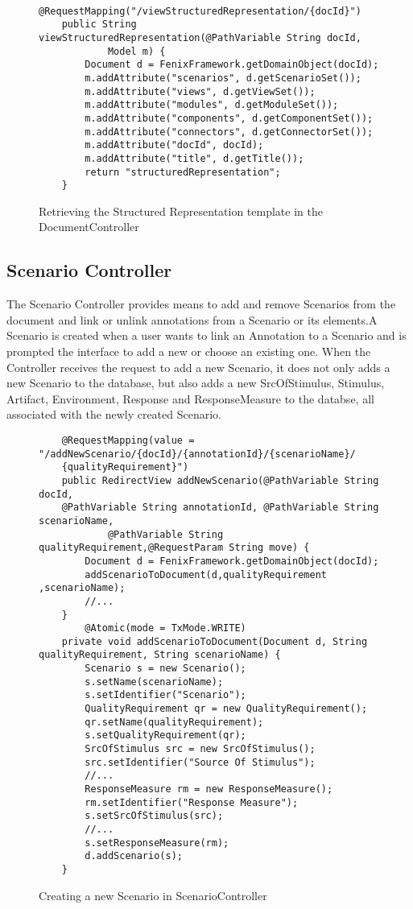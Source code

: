 \begin{itemize}
\begin{figure}[h]
\lstset{style=customjava}
\begin{lstlisting}
	@RequestMapping("/viewStructuredRepresentation/{docId}")
	public String viewStructuredRepresentation(@PathVariable String docId,
			Model m) {
		Document d = FenixFramework.getDomainObject(docId);
		m.addAttribute("scenarios", d.getScenarioSet());
		m.addAttribute("views", d.getViewSet());
		m.addAttribute("modules", d.getModuleSet());
		m.addAttribute("components", d.getComponentSet());
		m.addAttribute("connectors", d.getConnectorSet());
		m.addAttribute("docId", docId);
		m.addAttribute("title", d.getTitle());
		return "structuredRepresentation";
	}
\end{lstlisting}
\caption{Retrieving the Structured Representation template in the DocumentController}
\label{figure:documentControllerStructuredRepresentation}
\end{figure}
\end{itemize}

\subsection{Scenario Controller}

The Scenario Controller provides means to add and remove Scenarios from the document and link or unlink annotations from a Scenario or its elements.A Scenario is created when a user wants to link an Annotation to a Scenario and is prompted the interface to add a new or choose an existing one. When the Controller receives the request to add a new Scenario, it does not only adds a new Scenario to the database, but also adds a new SrcOfStimulus, Stimulus, Artifact, Environment, Response and ResponseMeasure to the databse, all associated with the newly created Scenario. 

\begin{figure}[h]
\lstset{style=customjava}
\begin{lstlisting}
	@RequestMapping(value = "/addNewScenario/{docId}/{annotationId}/{scenarioName}/
	{qualityRequirement}")
	public RedirectView addNewScenario(@PathVariable String docId, 
	@PathVariable String annotationId, @PathVariable String scenarioName, 
			@PathVariable String qualityRequirement,@RequestParam String move) {
		Document d = FenixFramework.getDomainObject(docId);
		addScenarioToDocument(d,qualityRequirement ,scenarioName);		
		//...
	}
		@Atomic(mode = TxMode.WRITE)
	private void addScenarioToDocument(Document d, String qualityRequirement, String scenarioName) {
		Scenario s = new Scenario();
		s.setName(scenarioName);
		s.setIdentifier("Scenario");
		QualityRequirement qr = new QualityRequirement();
		qr.setName(qualityRequirement);
		s.setQualityRequirement(qr);
		SrcOfStimulus src = new SrcOfStimulus();
		src.setIdentifier("Source Of Stimulus");
		//...
		ResponseMeasure rm = new ResponseMeasure();
		rm.setIdentifier("Response Measure");
		s.setSrcOfStimulus(src);
		//...
		s.setResponseMeasure(rm);
		d.addScenario(s);
	}	
\end{lstlisting}
\caption{Creating a new Scenario in ScenarioController}
\label{figure:scenarioControllerNewScenario}
\end{figure}

